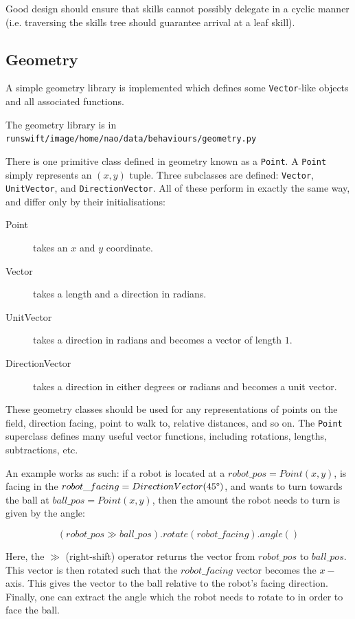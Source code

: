 Good design should ensure that skills cannot possibly delegate in a cyclic manner (i.e. traversing the skills tree should guarantee arrival at a leaf skill).

\subsection{Geometry}

A simple geometry library is implemented which defines some \texttt{Vector}-like objects and all associated functions.

The geometry library is in \texttt{runswift/image/home/nao/data/behaviours/geometry.py}

There is one primitive class defined in geometry known as a \texttt{Point}. A \texttt{Point} simply represents an $(x, y)$ tuple. Three subclasses are defined: \texttt{Vector}, \texttt{UnitVector}, and \texttt{DirectionVector}. All of these perform in exactly the same way, and differ only by their initialisations:

\begin{description}
\item[Point] takes an $x$ and $y$ coordinate.
\item[Vector] takes a length and a direction in radians.
\item[UnitVector] takes a direction in radians and becomes a vector of length $1$.
\item[DirectionVector] takes a direction in either degrees or radians and becomes a unit vector.
\end{description}

These geometry classes should be used for any representations of points on the field, direction facing, point to walk to, relative distances, and so on. The \texttt{Point} superclass defines many useful vector functions, including rotations, lengths, subtractions, etc.

An example works as such: if a robot is located at a $robot\_pos = Point(x, y)$, is facing in the $robot\_facing = DirectionVector(45\degree)$, and wants to turn towards the ball at $ball\_pos = Point(x, y)$, then the amount the robot needs to turn is given by the angle:

\begin{equation}
(robot\_pos \gg ball\_pos).rotate(robot\_facing).angle()
\end{equation}

Here, the $\gg$ (right-shift) operator returns the vector from $robot\_pos$ to $ball\_pos$. This vector is then rotated such that the $robot\_facing$ vector becomes the $x-$axis. This gives the vector to the ball relative to the robot's facing direction. Finally, one can extract the angle which the robot needs to rotate to in order to face the ball.

